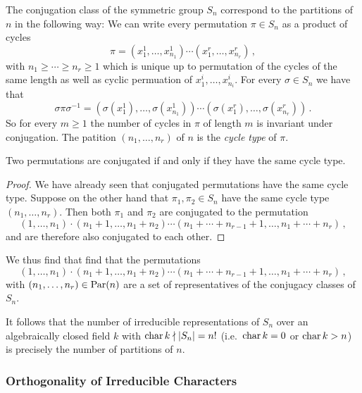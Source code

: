 \begin{example}
  The conjugation class of the symmetric group $S_n$ correspond to the partitions of $n$ in the following way:
  We can write every permutation $\pi \in S_n$ as a product of cycles
  \[
      \pi
    = \left( x^1_1, \dotsc, x^1_{n_1} \right)
      \dotsm
      \left(x^r_1, \dotsc, x^r_{n_r} \right) \,,
  \]
  with $n_1 \geq \dotsb \geq n_r \geq 1$ which is unique up to permutation of the cycles of the same length as well as cyclic permuation of $x^i_1, \dotsc, x^i_{n_i}$.
  For every $\sigma \in S_n$ we have that
  \[
      \sigma \pi \sigma^{-1}
    = \left( \sigma(x^1_1), \dotsc, \sigma(x^1_{n_1}) \right)
      \dotsm
      \left( \sigma(x^r_1), \dotsc, \sigma(x^r_{n_r}) \right) \,.
  \]
  So for every $m \geq 1$ the number of cycles in $\pi$ of length $m$ is invariant under conjugation.
  The patition $(n_1, \dotsc, n_r)$ of $n$ is the \emph{cycle type} of $\pi$.
  
  \begin{claim}
    Two permutations are conjugated if and only if they have the same cycle type.
  \end{claim}
  
  \begin{proof}
    We have already seen that conjugated permutations have the same cycle type.
    Suppose on the other hand that $\pi_1, \pi_2 \in S_n$ have the same cycle type $(n_1, \dotsc, n_r)$.
    Then both $\pi_1$ and $\pi_2$ are conjugated to the permutation
    \[
              (1, \dotsc, n_1)
      \cdot   (n_1 + 1, \dotsc, n_1 + n_2)
      \dotsm  (n_1 + \dotsb + n_{r-1} + 1, \dotsc, n_1 + \dotsb + n_r) \,,
    \]
    and are therefore also conjugated to each other.
  \end{proof}
  We thus find that find that the permutations
  \[
            (1, \dotsc, n_1)
    \cdot   (n_1 + 1, \dotsc, n_1 + n_2)
    \dotsm  (n_1 + \dotsb + n_{r-1} + 1, \dotsc, n_1 + \dotsb + n_r) \,,
  \]
  with $(n_1, \dotsc, n_r) \in \operatorname{Par}(n)$ are a set of representatives of the conjugacy classes of $S_n$.
  
  It follows that the number of irreducible representations of $S_n$ over an algebraically closed field $k$ with $\operatorname{char} k \nmid |S_n| = n!$ (i.e.\ $\operatorname{char} k = 0$ or $\operatorname{char} k > n$) is precisely the number of partitions of $n$.
\end{example}



\subsubsection{Orthogonality of Irreducible Characters}


